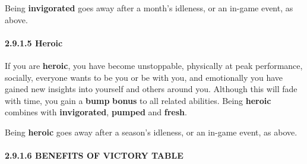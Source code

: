 \documentclass[
]{article}
\begin{document}
Being \textbf{invigorated} goes away after a month's idleness, or an
in-game event, as above.

\hypertarget{heroic}{%
\paragraph{2.9.1.5 Heroic}\label{heroic}}

If you are \textbf{heroic}, you have become unstoppable, physically at
peak performance, socially, everyone wants to be you or be with you, and
emotionally you have gained new insights into yourself and others around
you. Although this will fade with time, you gain a \textbf{bump}
\textbf{bonus} to all related abilities. Being \textbf{heroic} combines
with \textbf{invigorated}, \textbf{pumped} and \textbf{fresh}.

Being \textbf{heroic} goes away after a season's idleness, or an in-game
event, as above.

\hypertarget{benefits-of-victory-table}{%
\paragraph{2.9.1.6 BENEFITS OF VICTORY
TABLE}\label{benefits-of-victory-table}}
\end{document}
